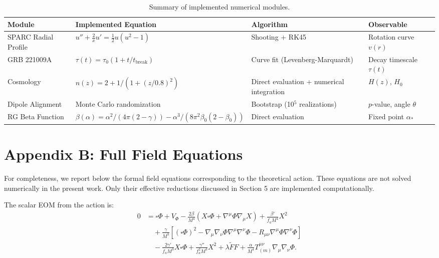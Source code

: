 \documentclass[12pt,a4paper]{article}
\numberwithin{equation}{section}
\begin{document}
\begin{table}[h]
\centering
\caption{Summary of implemented numerical modules.}
\begin{tabular}{p{3cm} p{4cm} p{3cm} p{3cm}}
\toprule
\textbf{Module} & \textbf{Implemented Equation} & \textbf{Algorithm} & \textbf{Observable} \\
\midrule
SPARC Radial Profile & $u'' + \frac{2}{x}u' = \frac{1}{2}u(u^2-1)$ & Shooting + RK45 & Rotation curve $v(r)$ \\
GRB 221009A & $\tau(t) = \tau_0(1+t/t_{\text{break}})$ & Curve fit (Levenberg-Marquardt) & Decay timescale $\tau(t)$ \\
Cosmology & $n(z) = 2 + 1/(1+(z/0.8)^2)$ & Direct evaluation + numerical integration & $H(z)$, $H_0$ \\
Dipole Alignment & Monte Carlo randomization & Bootstrap (10$^5$ realizations) & $p$-value, angle $\theta$ \\
RG Beta Function & $\beta(\alpha) = \alpha^2/(4\pi(2-\gamma)) - \alpha^3/(8\pi^2\beta_0(2-\beta_0))$ & Direct evaluation & Fixed point $\alpha_*$ \\
\bottomrule
\end{tabular}
\label{tab:appendix}
\end{table}

\section{Appendix B: Full Field Equations}

For completeness, we report below the formal field equations corresponding to the theoretical action. These equations are not solved numerically in the present work. Only their effective reductions discussed in Section 5 are implemented computationally.

The scalar EOM from the action is:
\begin{align}
0 &= \square \Phi + V_\Phi - \frac{2\beta}{M^4}\left(X\square\Phi + \nabla^\mu\Phi \nabla_\mu X\right) + \frac{\beta'}{f_a M^4} X^2 \nonumber \\
&\quad + \frac{\gamma}{M^3}\left[(\square\Phi)^2 - \nabla_\mu\nabla_\nu\Phi \nabla^\mu\nabla^\nu\Phi - R_{\mu\nu}\nabla^\mu\Phi\nabla^\nu\Phi\right] \nonumber \\
&\quad - \frac{2\gamma'}{f_a M^3} X\square\Phi + \frac{\gamma''}{f_a^2 M^3} X^2 + \lambda \tilde{F}F + \frac{\alpha}{M^4} T^{\mu\nu}_{(m)} \nabla_\mu\nabla_\nu\Phi.
\end{align}
\end{document}
